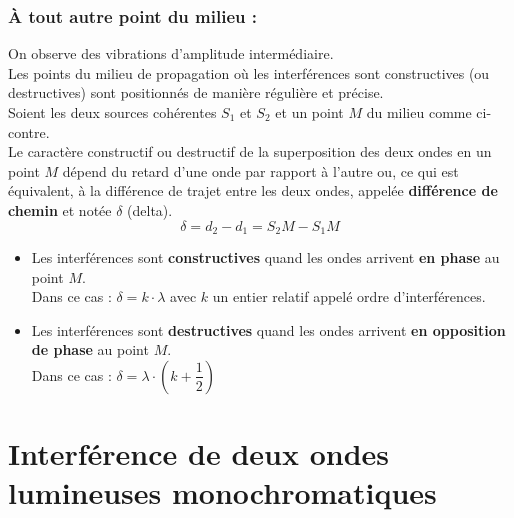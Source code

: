 \documentclass[a4paper,12pt,fleqn]{scrartcl}%
\begin{document}
		\subsubsection*{À tout autre point du milieu :}
		On observe des vibrations d'amplitude intermédiaire.\\
	Les points du milieu de propagation où les interférences sont constructives (ou destructives) sont positionnés de manière régulière et précise.\\
	Soient les deux sources cohérentes $S_1$ et $S_2$ et un point $M$ du milieu comme ci-contre.\\
	Le caractère constructif ou destructif de la superposition des deux ondes en un point $M$ dépend du retard d'une onde par rapport à l'autre ou, ce qui est équivalent, à la différence de trajet entre les deux ondes, appelée \textbf{différence de chemin} et notée $\delta$ (delta).
		$$\delta = d_2 - d_1 = S_2M - S_1M $$
	\begin{itemize}
	\item Les interférences sont \textbf{constructives} quand les ondes arrivent \textbf{en phase} au point $M$.\\ Dans ce cas : $\delta = k\cdot \lambda$ avec $k$ un entier relatif appelé ordre d'interférences.
	\item Les interférences sont \textbf{destructives} quand les ondes arrivent \textbf{en opposition de phase} au point $M$. \\ Dans ce cas : $\delta = \lambda \cdot \left( k+\dfrac{1}{2} \right)$
	\end{itemize}
\begin{center}
\end{center}


\section{Interférence de deux ondes lumineuses monochromatiques}
\end{document}
